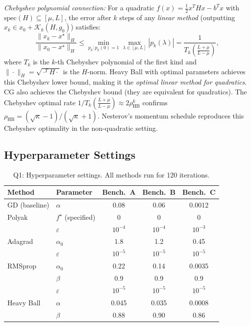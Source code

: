 \documentclass[11pt,a4paper]{article}
\theoremstyle{definition}
\begin{document}
\noindent\textit{Chebyshev polynomial connection:} For a quadratic $f(x) = \frac{1}{2}x^T H x - b^T x$ with $\text{spec}(H) \subseteq [\mu, L]$, the error after $k$ steps of any \emph{linear method} (outputting $x_k \in x_0 + \mathcal{K}_k(H, g_0)$) satisfies:
\begin{equation}
\frac{\|x_k - x^{\star}\|_H}{\|x_0 - x^{\star}\|_H} \leq \min_{p_k : p_k(0)=1} \max_{\lambda \in [\mu,L]} |p_k(\lambda)| = \frac{1}{T_k\!\left(\frac{L+\mu}{L-\mu}\right)},
\end{equation}
where $T_k$ is the $k$-th Chebyshev polynomial of the first kind and $\|\cdot\|_H = \sqrt{\cdot^T H \cdot}$ is the $H$-norm. Heavy Ball with optimal parameters achieves this Chebyshev lower bound, making it the \emph{optimal linear method for quadratics}. CG also achieves the Chebyshev bound (they are equivalent for quadratics). The Chebyshev optimal rate $1/T_k(\frac{L+\mu}{L-\mu}) \approx 2\rho_{\text{HB}}^k$ confirms $\rho_{\text{HB}} = (\sqrt{\kappa}-1)/(\sqrt{\kappa}+1)$. Nesterov's momentum schedule reproduces this Chebyshev optimality in the non-quadratic setting.

\subsection{Hyperparameter Settings}

\begin{table}[H]
\centering
\caption{Q1: Hyperparameter settings. All methods run for 120 iterations.}
\label{tab:q1_params}
\begin{tabular}{llccc}
\toprule
\textbf{Method} & \textbf{Parameter} & \textbf{Bench.\ A} & \textbf{Bench.\ B} & \textbf{Bench.\ C} \\
\midrule
GD (baseline) & $\alpha$ & 0.08 & 0.06 & 0.0012 \\
\midrule
Polyak & $f^{\star}$ (specified) & 0 & 0 & 0 \\
 & $\varepsilon$ & $10^{-4}$ & $10^{-4}$ & $10^{-3}$ \\
\midrule
Adagrad & $\alpha_0$ & 1.8 & 1.2 & 0.45 \\
 & $\varepsilon$ & $10^{-5}$ & $10^{-5}$ & $10^{-5}$ \\
\midrule
RMSprop & $\alpha_0$ & 0.22 & 0.14 & 0.0035 \\
 & $\beta$ & 0.9 & 0.9 & 0.9 \\
 & $\varepsilon$ & $10^{-5}$ & $10^{-5}$ & $10^{-5}$ \\
\midrule
Heavy Ball & $\alpha$ & 0.045 & 0.035 & 0.0008 \\
 & $\beta$ & 0.88 & 0.90 & 0.86 \\
\bottomrule
\end{tabular}
\end{table}
\end{document}
